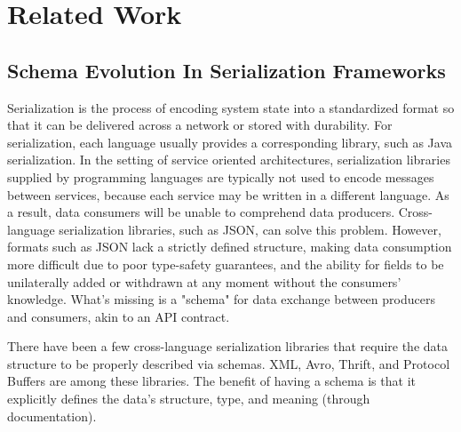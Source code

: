
%

\chapter{Related Work}
\label{cha:related_work}

\section{Schema Evolution In Serialization Frameworks} %
\label{sec:schema_evolution_in_serialization_frameworks}

Serialization is the process of encoding system state into a standardized format so that it can be delivered across a network or stored with durability.
For serialization, each language usually provides a corresponding library, such as Java serialization.
In the setting of service oriented architectures, serialization libraries supplied by programming languages are typically not used to encode messages between services,
because each service may be written in a different language. As a result, data consumers will be unable to comprehend data producers.
Cross-language serialization libraries, such as JSON, can solve this problem.
However, formats such as JSON lack a strictly defined structure,
making data consumption more difficult due to poor type-safety guarantees, and the ability for fields to be unilaterally added or withdrawn at any moment without the consumers' knowledge.
What's missing is a "schema" for data exchange between producers and consumers, akin to an API contract.

There have been a few cross-language serialization libraries that require the data structure to be properly described via schemas.
XML, Avro, Thrift, and Protocol Buffers are among these libraries.
The benefit of having a schema is that it explicitly defines the data's structure, type, and meaning (through documentation).

